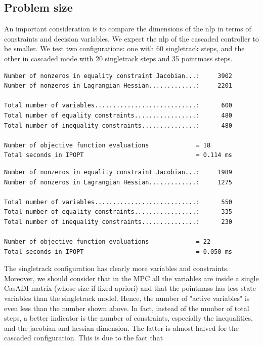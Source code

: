 \documentclass[a4paper, onecolumn, 11pt]{article}
\begin{document}
\subsection{Problem size}
An important consideration is to compare the dimensions of the nlp in terms of
constraints and decision variables. We expect the nlp of the cascaded
controller to be smaller. We test two configurations: one with 60 singletrack
steps, and the other in cascaded mode with 20 singletrack steps and 35 pointmass
steps. \\
\begin{Verbatim}[frame=single,label=Singletrack with 60 steps,labelposition=topline,framesep=10pt]
Number of nonzeros in equality constraint Jacobian...:     3902
Number of nonzeros in Lagrangian Hessian.............:     2201

Total number of variables............................:      600
Total number of equality constraints.................:      480
Total number of inequality constraints...............:      480

Number of objective function evaluations             = 18
Total seconds in IPOPT                               = 0.114 ms
\end{Verbatim} 
\vspace{1mm}
\begin{Verbatim}[frame=single,label=Cascaded with 20+35 steps,labelposition=topline,framesep=10pt]
Number of nonzeros in equality constraint Jacobian...:     1989
Number of nonzeros in Lagrangian Hessian.............:     1275

Total number of variables............................:      550
Total number of equality constraints.................:      335
Total number of inequality constraints...............:      230

Number of objective function evaluations             = 22
Total seconds in IPOPT                               = 0.050 ms
\end{Verbatim}
The singletrack configuration has clearly more variables and constraints.
Moreover, we should consider that in the MPC all the variables are inside a
single CasADI matrix (whose size if fixed apriori) and that the pointmass has
less state variables than the singletrack model. Hence, the number of "active
variables" is even less than the number shown above. In fact, instead of the
number of total steps, a better indicator is the number of constraints,
especially the inequalities, and the jacobian and hessian dimension. The latter
is almost halved for the cascaded configuration. This is due to the fact that
\end{document}
